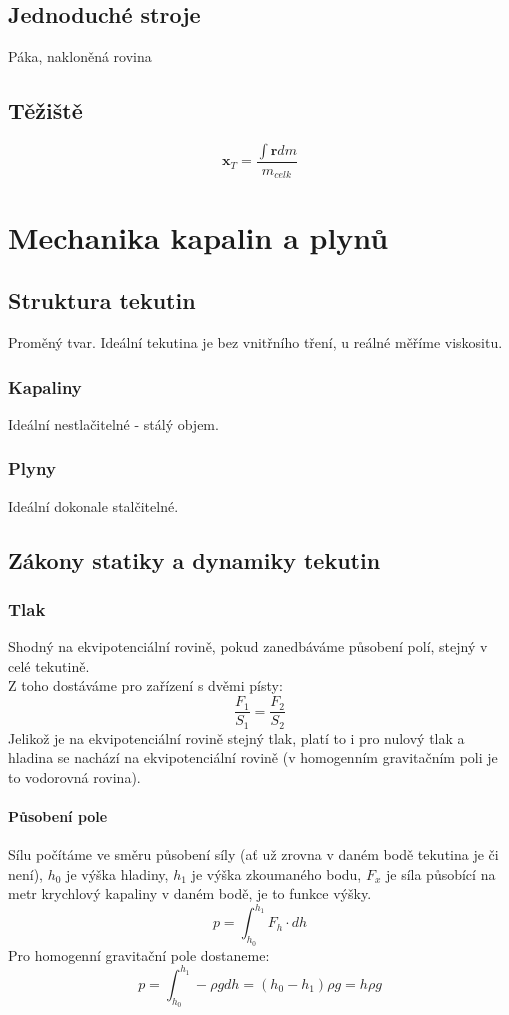 \documentclass[titlepage]{report}
\begin{document}
\section{Jednoduché stroje}
Páka, nakloněná rovina
\section{Těžiště}
\begin{equation}
\boldsymbol x_T = \frac{\int \boldsymbol r dm}{m_{celk}}
\end{equation}
\chapter{Mechanika kapalin a plynů}
\section{Struktura tekutin}
Proměný tvar. Ideální tekutina je bez vnitřního tření, u reálné měříme viskositu.
\subsection{Kapaliny}
Ideální nestlačitelné - stálý objem.
\subsection{Plyny}
Ideální dokonale stalčitelné.
\section{Zákony statiky a dynamiky tekutin}
\subsection{Tlak}
Shodný na ekvipotenciální rovině, pokud zanedbáváme působení polí, stejný v celé tekutině.\\
Z toho dostáváme pro zařízení s dvěmi písty:\\
\begin{equation}
\frac{F_1}{S_1} = \frac{F_2}{S_2}
\end{equation}
Jelikož je na ekvipotenciální rovině stejný tlak, platí to i pro nulový tlak a hladina se nachází na ekvipotenciální rovině (v homogenním gravitačním poli je to vodorovná rovina).
\subsubsection{Působení pole}
Sílu počítáme ve směru působení síly (ať už zrovna v daném bodě tekutina je či není), $h_0$ je výška hladiny, $h_1$ je výška zkoumaného bodu, $F_x$ je síla působící na metr krychlový kapaliny v daném bodě, je to funkce výšky.\\
\begin{equation}
p = \int_{h_0}^{h_1}F_h \cdot dh
\end{equation}
Pro homogenní gravitační pole dostaneme:\\
\begin{equation}
p = \int_{h_0}^{h_1} - \rho g dh = (h_0 - h_1) \rho g = h \rho g
\end{equation}
\end{document}
